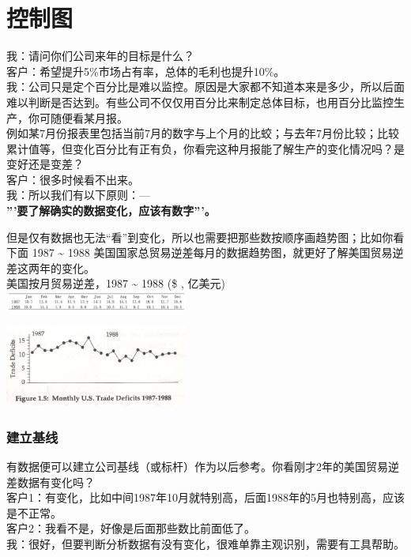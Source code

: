 \chapter{控制图} %

我：请问你们公司来年的目标是什么？\\
客户：希望提升5\%市场占有率，总体的毛利也提升10\%。\\
我：公司只是定个百分比是难以监控。原因是大家都不知道本来是多少，所以后面难以判断是否达到。有些公司不仅仅用百分比来制定总体目标，也用百分比监控生产，你可随便看某月报。\\
例如某7月份报表里包括当前7月的数字与上个月的比蛟；与去年7月份比较；比较累计值等，但变化百分比有正有负，你看完这种月报能了解生产的变化情况吗？是变好还是变差？\\
客户：很多时候看不出来。\\
我：所以我们有以下原则：---\\
\textbf{'''要了解确实的数据变化，应该有数字'''。}

但是仅有数据也无法``看''到变化，所以也需要把那些数按顺序画趋势图；比如你看下面
1987 \textasciitilde{} 1988
美国国家总贸易逆差每月的数据趋势图，就更好了解美国贸易逆差这两年的变化。\\
美国按月贸易逆差，1987 \textasciitilde{} 1988 (\$ , 亿美元)\\

\includegraphics[width=6cm]{The_key_fig1311.png}

\includegraphics[width=6cm]{The_key_fig151.png}

\hypertarget{ux5efaux7acbux57faux7ebf}{%
\subsection{建立基线}\label{ux5efaux7acbux57faux7ebf}}

有数据便可以建立公司基线（或标杆）作为以后参考。你看刚才2年的美国贸易逆差数据有变化吗？\\
客户1：有变化，比如中间1987年10月就特别高，后面1988年的5月也特别高，应该是不正常。\\
客户2：我看不是，好像是后面那些数比前面低了。\\
我：很好，但要判断分析数据有没有变化，很难单靠主观识别，需要有工具帮助。

